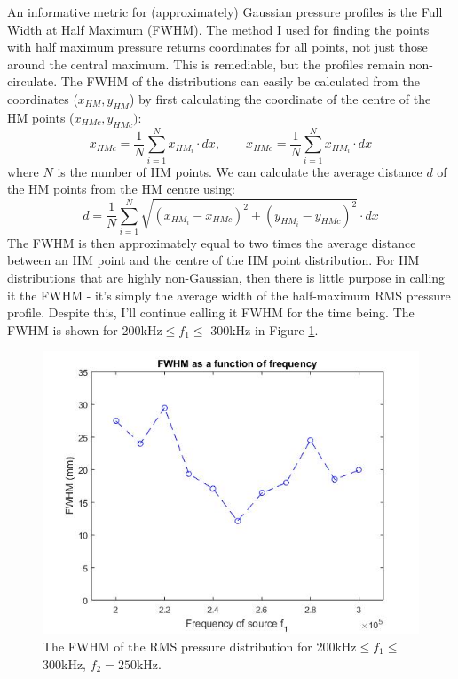 \documentclass[10pt,a4paper]{article}
\begin{document}
An informative metric for (approximately) Gaussian pressure profiles is the Full Width at Half Maximum (FWHM). The method I used for finding the points with half maximum pressure returns coordinates for all points, not just those around the central maximum. This is remediable, but the profiles remain non-circulate. The FWHM of the distributions can easily be calculated from the coordinates ($x_{HM},y_{HM}$) by first calculating the coordinate of the centre of the HM points ($x_{HMc}, y_{HMc})$:
\begin{equation}
x_{HMc} = \frac{1}{N} \sum_{i=1}^N x_{HM_i} \cdot dx, \quad \quad x_{HMc} = \frac{1}{N} \sum_{i=1}^N x_{HM_i} \cdot dx
\end{equation}
where $N$ is the number of HM points. We can calculate the average distance $d$ of the HM points from the HM centre using:
\begin{equation}
d = \frac{1}{N}  \sum_{i=1}^N \sqrt{ (x_{HM_i} - x_{HMc})^2 + (y_{HM_i} - y_{HMc})^2} \cdot dx 
\end{equation}
The FWHM is then approximately equal to two times the average distance between an HM point and the centre of the HM point distribution. For HM distributions that are highly non-Gaussian, then there is little purpose in calling it the FWHM - it's simply the average width of the half-maximum RMS pressure profile. Despite this, I'll continue calling it FWHM for the time being. The FWHM is shown for 200kHz$\leq f_1 \leq$ 300kHz in Figure \ref{FWHM_freq}.

\begin{figure}[H]\label{FWHM_freq}
\centering
\includegraphics[scale=0.6]{FWHM_freq}
\caption{The FWHM of the RMS pressure distribution for 200kHz$\leq f_1 \leq$ 300kHz, $f_2 = 250$kHz.}
\end{figure}
\end{document}
